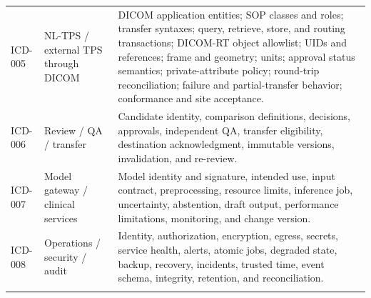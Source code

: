\documentclass[11pt,letterpaper]{article}
\begin{document}
\begin{small}
\begin{longtable}{@{}L{0.13\textwidth}L{0.24\textwidth}L{0.55\textwidth}@{}}
\addlinespace[2pt]
ICD-005 & NL-TPS \slash\allowbreak{} external TPS through DICOM & DICOM application entities; SOP classes and roles; transfer syntaxes; query, retrieve, store, and routing transactions; DICOM-RT object allowlist; UIDs and references; frame and geometry; units; approval status semantics; private-attribute policy; round-trip reconciliation; failure and partial-transfer behavior; conformance and site acceptance. \\
\addlinespace[2pt]
ICD-006 & Review \slash\allowbreak{} QA \slash\allowbreak{} transfer & Candidate identity, comparison definitions, decisions, approvals, independent QA, transfer eligibility, destination acknowledgment, immutable versions, invalidation, and re-review. \\
\addlinespace[2pt]
ICD-007 & Model gateway \slash\allowbreak{} clinical services & Model identity and signature, intended use, input contract, preprocessing, resource limits, inference job, uncertainty, abstention, draft output, performance limitations, monitoring, and change version. \\
\addlinespace[2pt]
ICD-008 & Operations \slash\allowbreak{} security \slash\allowbreak{} audit & Identity, authorization, encryption, egress, secrets, service health, alerts, atomic jobs, degraded state, backup, recovery, incidents, trusted time, event schema, integrity, retention, and reconciliation. \\
\addlinespace[2pt]
\end{longtable}
\end{small}
\end{document}
